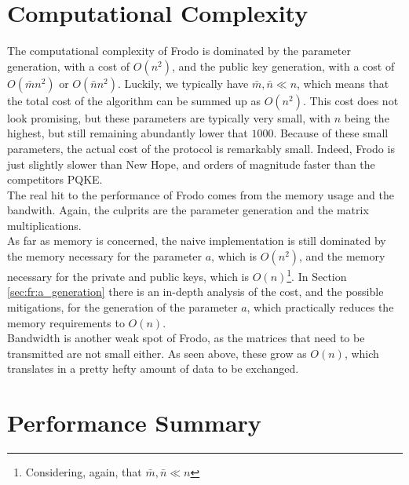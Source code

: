 \section{Computational Complexity}
The computational complexity of Frodo is dominated by the parameter generation, with a cost of $O(n^2)$, and the public key generation, with a cost of $O(\bar{m}n^2)$ or $O(\bar{n}n^2)$. Luckily, we typically have $\bar{m},\bar{n} \ll n$, which means that the total cost of the algorithm can be summed up as $O(n^2)$. This cost does not look promising, but these parameters are typically very small, with $n$ being the highest, but still remaining abundantly lower that $1000$. Because of these small parameters, the actual cost of the protocol is remarkably small. Indeed, Frodo is just slightly slower than New Hope, and orders of magnitude faster than the competitors PQKE.\\
The real hit to the performance of Frodo comes from the memory usage and the bandwith. Again, the culprits are the parameter generation and the matrix multiplications.\\
As far as memory is concerned, the naive implementation is still dominated by the memory necessary for the parameter $a$, which is $O(n^2)$, and the memory necessary for the private and public keys, which is $O(n)$\footnote{Considering, again, that $\bar{m},\bar{n} \ll n$}. In Section \ref{sec:fr:a_generation} there is an in-depth analysis of the cost, and the possible mitigations, for the generation of the parameter $a$, which practically reduces the memory requirements to $O(n)$.\\
Bandwidth is another weak spot of Frodo, as the matrices that need to be transmitted are not small either. As seen above, these grow as $O(n)$, which translates in a pretty hefty amount of data to be exchanged.\\

\section{Performance Summary}

